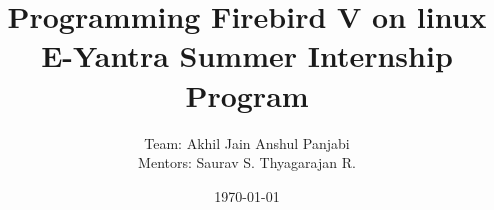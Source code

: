 \documentclass[20pt]{report}
\begin{document}
\title{\textbf{\LARGE{Programming Firebird V on linux} \vspace{0.3in} \\  E-Yantra Summer Internship  Program}}
\author{Team:\hspace{0.1in} Akhil Jain \hspace{0.2in} Anshul Panjabi \\ \vspace{0.2in}  Mentors: \vspace{0.05in} Saurav S. \hspace{0.2in} Thyagarajan R.}

\date{\today}

\maketitle

\tableofcontents


\end{document}
